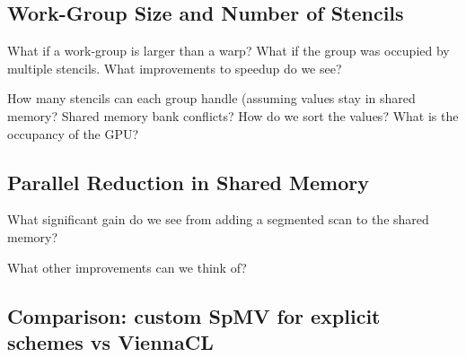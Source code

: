 \subsection{Work-Group Size and Number of Stencils}
What if a work-group is larger than a warp? What if the group was occupied by multiple stencils. What improvements to speedup do we see?

How many stencils can each group handle (assuming values stay in shared memory? 
Shared memory bank conflicts? How do we sort the values? 
What is the occupancy of the GPU?

\subsection{Parallel Reduction in Shared Memory}
What significant gain do we see from adding a segmented scan to the shared memory? 

What other improvements can we think of? 

\subsection{Comparison: custom SpMV for explicit schemes vs ViennaCL}